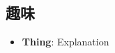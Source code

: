 \documentclass[letterpaper,11pt]{article}
\newcommand{\resumeItem}[2]{
  \item\small{
    \textbf{#1}{: #2 \vspace{-2pt}}
  }
}
\newcommand{\resumeSubItem}[2]{\resumeItem{#1}{#2}\vspace{-4pt}}
\newcommand{\resumeSubHeadingListStart}{\begin{itemize}[leftmargin=*]}
\newcommand{\resumeSubHeadingListEnd}{\end{itemize}}
\begin{document}
\begin{CJK}{UTF8}{ipxma}
\section{趣味}
\resumeSubHeadingListStart
\resumeSubItem{Thing}{Explanation}
\resumeSubHeadingListEnd

%
\end{CJK}
\end{document}
